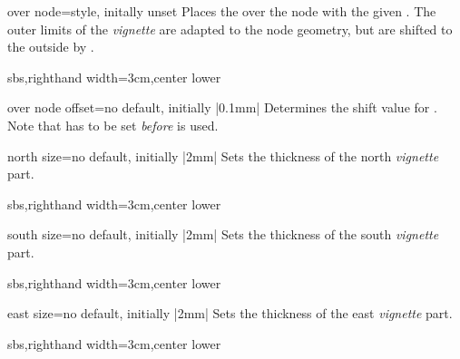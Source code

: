 \begin{vigTcbKey}[][doc new=2016-04-22]{over node}{=}{style, initally unset}
  Places the  over the node with the given .
  The outer limits of the \emph{vignette} are adapted to the node geometry, but
  are shifted to the outside by .
\begin{dispExample*}{sbs,righthand width=3cm,center lower}
\end{dispExample*}
\end{vigTcbKey}

\begin{vigTcbKey}[][doc new=2016-04-22]{over node offset}{=}{no default, initially |0.1mm|}
  Determines the shift value for .
  Note that  has to be set \emph{before}
   is used.
\end{vigTcbKey}


\begin{vigTcbKey}[][doc new=2016-04-22]{north size}{=}{no default, initially |2mm|}
  Sets the thickness of the north \emph{vignette} part.
\begin{dispExample*}{sbs,righthand width=3cm,center lower}
\end{dispExample*}
\end{vigTcbKey}

\begin{vigTcbKey}[][doc new=2016-04-22]{south size}{=}{no default, initially |2mm|}
  Sets the thickness of the south \emph{vignette} part.
\begin{dispExample*}{sbs,righthand width=3cm,center lower}
\end{dispExample*}
\end{vigTcbKey}

\begin{vigTcbKey}[][doc new=2016-04-22]{east size}{=}{no default, initially |2mm|}
  Sets the thickness of the east \emph{vignette} part.
\begin{dispExample*}{sbs,righthand width=3cm,center lower}
\end{dispExample*}
\end{vigTcbKey}


